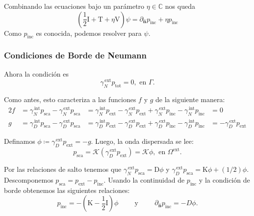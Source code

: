 \documentclass[11pt]{article}
\numberwithin{equation}{section}
\def\C{\mathbb{C}}
\def\n{\hat{\textbf{n}}}
\def\Dlpot{\mathcal{K}}
\def\Slop{\mathrm{V}}
\def\Dlop{\mathrm{K}}
\def\Adlop{\mathrm{T}}
\def\Hop{\mathrm{D}}
\def\Idop{\textrm{I}}
\def\traceN{\gamma_{N}}
\def\traceD{\gamma_{D}}
\def\tot{\textrm{tot}}
\def\exterior{\textrm{ext}}
\def\interior{\textrm{int}}
\def\inc{\textrm{inc}}
\def\sca{\textrm{sca}}
\begin{document}
\noindent Combinando las ecuaciones bajo un parámetro \(\eta \in \C\) nos queda
\begin{equation}
	\left(\frac{1}{2} \Idop + \Adlop + \eta \Slop \right)\psi
	=
	\partial_{\n} p_{\inc} + \eta p_{\inc}
\end{equation}
Como \(p_{\inc}\) es conocida, podemos resolver para \(\psi\). 

\subsubsection{Condiciones de Borde de Neumann}
\label{sssec:bem:exterior:neumann}

\noindent Ahora la condición es
\begin{equation}\label{bem:neumann}
	\traceN^{\,\exterior} p_{\tot} = 0, \text{ en } \Gamma.
\end{equation}

\noindent Como antes, esto caracteriza a las funciones \(f\) y \(g\) de la siguiente
manera:
\begin{alignat*}{2}
	f &=
	\traceN^{\,\interior} p_{\sca} - \traceN^{\,\exterior} p_{\sca}
	&=
	\traceN^{\,\interior} p_{\exterior} - \traceN^{\,\exterior} p_{\exterior}
	+
	\traceN^{\,\exterior} p_{\inc} - \traceN^{\,\interior} p_{\inc}
	&= 0\\
	g &=
	\traceD^{\,\interior} p_{\sca} - \traceD^{\,\exterior} p_{\sca}
	&=
	\traceD^{\,\interior} p_{\exterior} - \traceD^{\,\exterior} p_{\exterior}
	+
	\traceD^{\,\exterior} p_{\inc} - \traceD^{\,\interior} p_{\inc}
	&=
	-\traceD^{\,\exterior} p_{\exterior}
\end{alignat*}

Definamos \(\phi \coloneqq \traceD^{\,\exterior} p_{\exterior} = -g\). Luego, la onda
dispersada se lee:
\begin{equation}
	p_{\sca} 
	= \Dlpot (\traceD^{\,\exterior} p_{\exterior})
	= \Dlpot \phi
	,\textrm{ en } \Omega^{\exterior}.
\end{equation}

Por las relaciones de salto tenemos que
\(\traceN^{\,\exterior} p_{\sca} = \Hop \phi\) y \(\traceD^{\,\exterior}
p_{\sca} = \Dlop \phi + (1/2) \phi\). Descomponemos \(p_{\sca} = p_{\exterior} -
p_{\inc}\). Usando la continuidad de \(p_{\inc}\) y la condición de borde obtenemos
las siguientes relaciones: 
\[
	p_{\inc} = -\left(\Dlop - \frac{1}{2} \Idop \right) \phi
	\hspace{1cm}\text{y}\hspace{1cm}
	\partial_{\n} p_{\inc} = -D\phi
.\]
\end{document}
